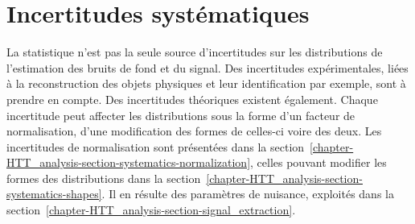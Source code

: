 \section{Incertitudes systématiques}\label{chapter-HTT_analysis-section-systematics}
La statistique n'est pas la seule source d'incertitudes sur les distributions de l'estimation des bruits de fond et du signal.
Des incertitudes expérimentales, liées à la reconstruction des objets physiques et leur identification par exemple, sont à prendre en compte.
Des incertitudes théoriques existent également.
Chaque incertitude peut affecter les distributions sous la forme d'un facteur de normalisation, d'une modification des formes de celles-ci voire des deux.
Les incertitudes de normalisation sont présentées dans la section~\ref{chapter-HTT_analysis-section-systematics-normalization},
celles pouvant modifier les formes des distributions dans la section~\ref{chapter-HTT_analysis-section-systematics-shapes}.
Il en résulte des paramètres de nuisance, exploités dans la section~\ref{chapter-HTT_analysis-section-signal_extraction}.

